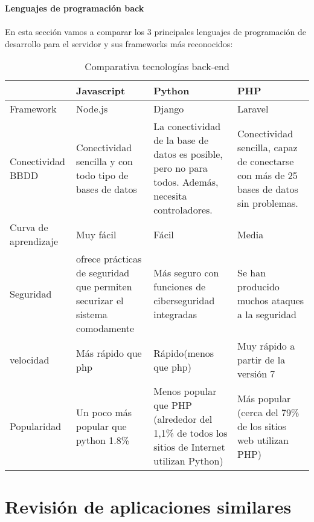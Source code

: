 \textbf{Lenguajes de programación back} \\ \\
En esta sección vamos a comparar los 3 principales lenguajes de programación de desarrollo para el servidor y sus frameworks más reconocidos: 
\begin{table}[H] %
    \centering
    \begin{tabular}{|p{2cm} |p{3cm} |p{3cm} |p{3cm} |} \hline 
         &  \textbf{Javascript}&  \textbf{Python}& \textbf{PHP}\\  \hline 
         Framework &  Node.js &  Django & Laravel\\ \hline
         
        Conectividad BBDD &  Conectividad sencilla y con todo tipo de bases de datos&  La conectividad de la base de datos es posible, pero no para todos. Además, necesita controladores. & Conectividad sencilla, capaz de conectarse con más de 25 bases de datos sin problemas.\\ \hline 
        Curva de aprendizaje &  Muy fácil & Fácil & Media\\ \hline 
        Seguridad &  ofrece prácticas de seguridad que permiten securizar el sistema comodamente &  Más seguro con funciones de ciberseguridad integradas & Se han producido muchos ataques a la seguridad	\\ \hline 
        velocidad &  Más rápido que php &  Rápido(menos que php) & Muy rápido a partir de la versión 7\\ \hline 
        Popularidad & Un poco más popular que python 1.8\% &  Menos popular que PHP (alrededor del 1,1\% de todos los sitios de Internet utilizan Python) & Más popular (cerca del 79\% de los sitios web utilizan PHP)\\ \hline 
    \end{tabular}
    \caption{Comparativa tecnologías back-end }
    \label{tab:tec_back}
\end{table}


\section{Revisión de aplicaciones similares} \label{appssimilares}

